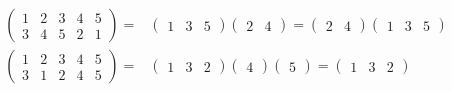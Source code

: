 \begin{example}[置换分解]
\begin{equation}\begin{aligned}
\begin{pmatrix}
1&2&3&4&5\\
3&4&5&2&1
\end{pmatrix}={}&
\begin{pmatrix}
1&3&5
\end{pmatrix}
\begin{pmatrix}
2&4
\end{pmatrix}=
\begin{pmatrix}
2&4
\end{pmatrix}
\begin{pmatrix}
1&3&5
\end{pmatrix}\\
\begin{pmatrix}
1&2&3&4&5\\
3&1&2&4&5
\end{pmatrix}={}&
\begin{pmatrix}
1&3&2
\end{pmatrix}
\begin{pmatrix}
4
\end{pmatrix}
\begin{pmatrix}
5
\end{pmatrix}=
\begin{pmatrix}
1&3&2
\end{pmatrix}
\end{aligned}\end{equation}
\end{example}

